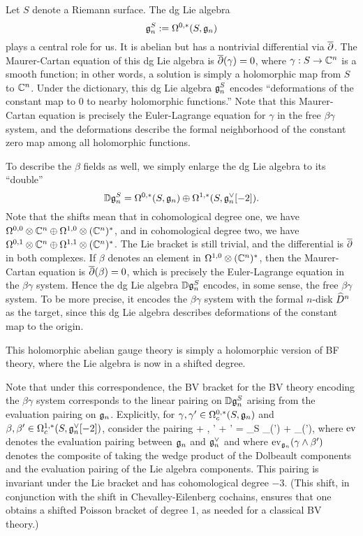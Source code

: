 Let $S$ denote a Riemann surface. 
The dg Lie algebra $$\mathfrak g_n^S := \Omega^{0,*}(S,\mathfrak g_n)$$ plays a central role for us.
It is abelian but has a nontrivial differential via $\overline{\partial}$.
The Maurer-Cartan equation of this dg Lie algebra is $\overline{\partial}(\gamma) = 0$, where $\gamma: S \to \mathbb C^n$ is a smooth function;
in other words, a solution is simply a holomorphic map from $S$ to $\mathbb C^n$.
Under the dictionary, this dg Lie algebra $\mathfrak g^S_n$ encodes ``deformations of the constant map to $0$ to nearby holomorphic functions.''
Note that this Maurer-Cartan equation is precisely the Euler-Lagrange equation for $\gamma$ in the free $\beta\gamma$ system,
and the deformations describe the formal neighborhood of the constant zero map among all holomorphic functions.

To describe the $\beta$ fields as well, we simply enlarge the dg Lie algebra to its ``double''
\[
\mathbb D \mathfrak g_n^S = \Omega^{0,*}(S, \mathfrak g_n) \oplus \Omega^{1,*}(S, \mathfrak g_n^\vee[-2]).
\]
Note that the shifts mean that in cohomological degree one, we have $\Omega^{0,0} \otimes \mathbb C^n \oplus \Omega^{1,0} \otimes (\mathbb C^n)^*$, 
and in cohomological degree two, we have $\Omega^{0,1} \otimes \mathbb C^n \oplus \Omega^{1,1} \otimes (\mathbb C^n)^*$.
The Lie bracket is still trivial, and the differential is $\overline{\partial}$ in both complexes. 
If $\beta$ denotes an element in $\Omega^{1,0} \otimes (\mathbb C^n)^*$,
then the Maurer-Cartan equation is $\overline{\partial}(\beta) = 0$, which is precisely the Euler-Lagrange equation in the $\beta\gamma$ system.
Hence the dg Lie algebra $\mathbb D \mathfrak g_n^S$ encodes, in some sense, the free $\beta\gamma$ system.
To be more precise, it encodes the $\beta\gamma$ system with the formal $n$-disk $\widehat{D}^n$ as the target,
since this dg Lie algebra describes deformations of the constant map to the origin.

\begin{rmk}
This holomorphic abelian gauge theory is simply a holomorphic version of BF theory, where the Lie algebra is now in a shifted degree.
\end{rmk}

Note that under this correspondence, the BV bracket for the BV theory encoding the $\beta\gamma$ system 
corresponds to the linear pairing on $\mathbb D \mathfrak g^S_n$ arising from the evaluation pairing on $\mathfrak{g}_n$. 
Explicitly, for $\gamma, \gamma' \in \Omega^{0,*}_c(S, \mathfrak g_n)$ and $\beta, \beta' \in \Omega^{1,*}_c(S, \mathfrak g_n^\vee[-2])$, 
consider the pairing
\be\label{pairing2}
\langle \gamma + \beta, \gamma' + \beta' \rangle = \int_S \ev_{\fgn}(\gamma \wedge \beta') + \ev_{\fgn}(\beta \wedge \gamma'),
\ee
where ${\rm ev}$ denotes the evaluation pairing between $\mathfrak{g}_n$ and $\mathfrak{g}_n^\vee$ and 
where ${\rm ev}_{\mathfrak{g}_n}(\gamma \wedge \beta')$ denotes the composite of taking the wedge product of the Dolbeault components 
and the evaluation pairing of the Lie algebra components.
This pairing is invariant under the Lie bracket and has cohomological degree $-3$.
(This shift, in conjunction with the shift in Chevalley-Eilenberg cochains, ensures that one obtains a shifted Poisson bracket of degree 1,
as needed for a classical BV theory.)

